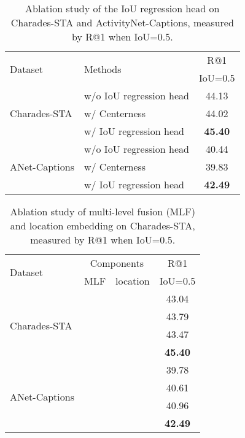 \documentclass[10pt,twocolumn,letterpaper]{article}
\begin{document}
	\begin{table}[!t]
		\centering
		\caption{Ablation study of the IoU regression head on Charades-STA and ActivityNet-Captions, measured by R@1 when IoU=0.5.}
		\begin{tabular}{l|l|c}
			\hline
			\multirow{2}{*}{Dataset} & \multirow{2}{*}{Methods} & R@1         \\
			&                          & IoU=0.5 \\ \hline
			\multirow{3}{*}{Charades-STA}     &    w/o IoU regression head      & 44.13  \\ 
			&    w/ Centerness          & 44.02    \\
			&    w/ IoU regression head     & \textbf{45.40}    \\
			\hline \hline
			\multirow{3}{*}{ANet-Captions}     &    w/o IoU regression head                   & 40.44       \\
			&    w/ Centerness                   & 39.83       \\
			&    w/ IoU regression head                   & \textbf{42.49}       \\
			\hline
\end{tabular}\label{tab:iou}
\end{table}

	\begin{table}[!t]
	\centering
	\caption{Ablation study of multi-level fusion (MLF) and location embedding on Charades-STA, measured by R@1 when IoU=0.5.}
	\begin{tabular}{l|cc|c}
		\hline
		\multirow{2}{*}{Dataset}       & \multicolumn{2}{c|}{Components} & R@1     \\ \cline{2-3}
		& MLF          & location         & IoU=0.5 \\ \hline
		\multirow{4}{*}{Charades-STA}  &           &       &  43.04       \\
		&    \checkmark         &                  &   43.79      \\
		&              &    \checkmark            &   43.47      \\
		&    \checkmark         &     \checkmark    &  \textbf{45.40}       \\ \hline \hline
		\multirow{4}{*}{ANet-Captions} &              &                  &     39.78    \\
		&    \checkmark          &                  &  40.61       \\
		&              &    \checkmark              &  40.96       \\
		&     \checkmark         &     \checkmark             &  \textbf{42.49}     \\ \hline 
	\end{tabular}\label{tab:mlf}
\vspace{-0.1in}
\end{table}
\end{document}
